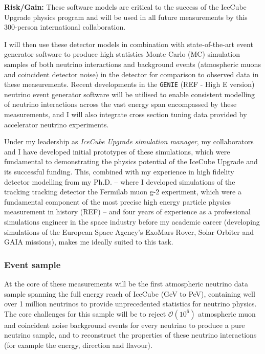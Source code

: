 \documentclass[a4paper,11pt]{article}
\begin{document}
\textbf{Risk/Gain:} These software models are critical to the success of the IceCube Upgrade physics program and will be used in all future measurements by this 300-person international collaboration.

I will then use these detector models in combination with state-of-the-art event generator software to produce high statistics Monte Carlo (MC) simulation samples of both neutrino interactions and background events (atmospheric muons and coincident detector noise) in the detector for comparison to observed data in these measurements. Recent developments in the \texttt{GENIE} (REF - High E version) neutrino event generator software will be utilised to enable consistent modelling of neutrino interactions across the vast energy span encompassed by these measurements, and I will also integrate cross section tuning data provided by accelerator neutrino experiments. 

Under my leadership as \textit{IceCube Upgrade simulation manager}, my collaborators and I have developed initial prototypes of these simulations, which were fundamental to demonstrating the physics potential of the IceCube Upgrade and its successful funding. This, combined with my experience in high fidelity detector modelling from my Ph.D. -- where I developed simulations of the tracking tracking detector the Fermilab muon g-2 experiment, which were a fundamental component of the most precise high energy particle physics measurement in history (REF) -- and four years of experience as a professional simulations engineer in the space industry before my academic career (developing simulations of the European Space Agency's ExoMars Rover, Solar Orbiter and GAIA missions), makes me ideally suited to this task. \\

\subsubsection{Event sample}

At the core of these measurements will be the first atmospheric neutrino data sample spanning the full energy reach of IceCube (GeV to PeV), containing well over 1 million neutrinos to provide unprecedented statistics for neutrino physics. The core challenges for this sample will be to reject $\mathcal{O}(10^6)$ atmospheric muon and coincident noise background events for every neutrino to produce a pure neutrino sample, and to reconstruct the properties of these neutrino interactions (for example the energy, direction and flavour). 
\end{document}

